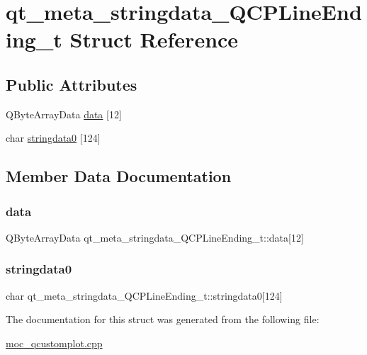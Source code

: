 \hypertarget{structqt__meta__stringdata__QCPLineEnding__t}{}\section{qt\+\_\+meta\+\_\+stringdata\+\_\+\+Q\+C\+P\+Line\+Ending\+\_\+t Struct Reference}
\label{structqt__meta__stringdata__QCPLineEnding__t}
\subsection*{Public Attributes}
\begin{DoxyCompactItemize}
\item 
Q\+Byte\+Array\+Data \mbox{\hyperlink{structqt__meta__stringdata__QCPLineEnding__t_afd1b8860d3c0d66e6e4abf54197c47e6}{data}} \mbox{[}12\mbox{]}
\item 
char \mbox{\hyperlink{structqt__meta__stringdata__QCPLineEnding__t_a20c616613071fe30d8f5bcf67c6851b2}{stringdata0}} \mbox{[}124\mbox{]}
\end{DoxyCompactItemize}


\subsection{Member Data Documentation}
\mbox{\label{structqt__meta__stringdata__QCPLineEnding__t_afd1b8860d3c0d66e6e4abf54197c47e6}} 
\subsubsection{\texorpdfstring{data}{data}}
{\footnotesize\ttfamily Q\+Byte\+Array\+Data qt\+\_\+meta\+\_\+stringdata\+\_\+\+Q\+C\+P\+Line\+Ending\+\_\+t\+::data\mbox{[}12\mbox{]}}

\mbox{\label{structqt__meta__stringdata__QCPLineEnding__t_a20c616613071fe30d8f5bcf67c6851b2}} 
\subsubsection{\texorpdfstring{stringdata0}{stringdata0}}
{\footnotesize\ttfamily char qt\+\_\+meta\+\_\+stringdata\+\_\+\+Q\+C\+P\+Line\+Ending\+\_\+t\+::stringdata0\mbox{[}124\mbox{]}}



The documentation for this struct was generated from the following file\+:\begin{DoxyCompactItemize}
\item 
\mbox{\hyperlink{moc__qcustomplot_8cpp}{moc\+\_\+qcustomplot.\+cpp}}\end{DoxyCompactItemize}
